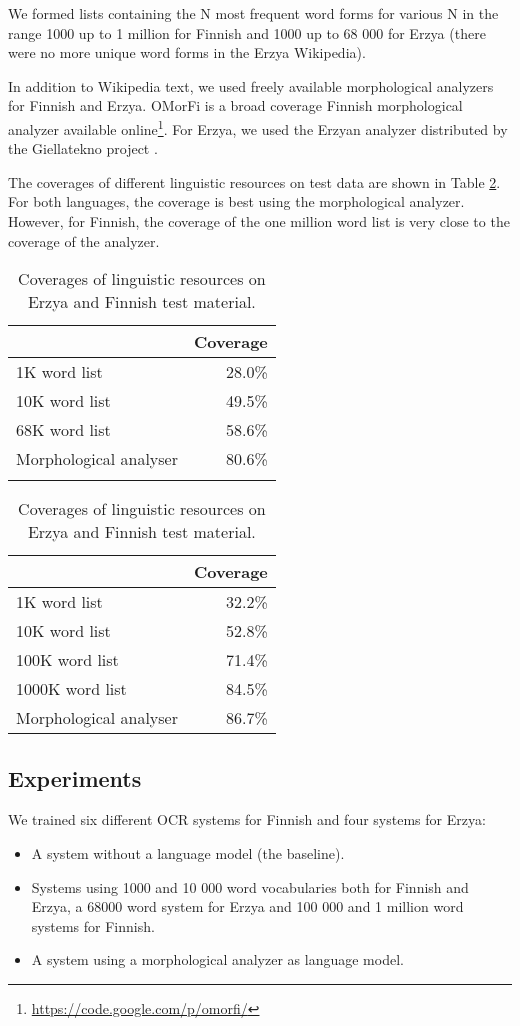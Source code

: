 \documentclass[b5paper]{article}
\begin{document}
We formed lists containing the N most frequent word forms for various
N in the range 1000 up to 1 million for Finnish and 1000 up to 68 000
for Erzya (there were no more unique word forms in the Erzya
Wikipedia).
 
In addition to Wikipedia text, we used freely available morphological
analyzers for Finnish and Erzya. OMorFi \cite{pirinen11} is a broad
coverage Finnish morphological analyzer available
online\footnote{\url{https://code.google.com/p/omorfi/}}. For Erzya,
we used the Erzyan analyzer distributed by the Giellatekno project
\cite{moshagen14}.

The coverages of different linguistic resources on test data are shown
in Table \ref{fin-myv-coverage}. For both languages, the coverage is
best using the morphological analyzer. However, for Finnish, the
coverage of the one million word list is very close to the coverage of
the analyzer.

\begin{table}[!htb]
\begin{center}
\begin{tabular}{lr}
\hline 
                        & Coverage  \\
\hline 
1K word list            &   28.0\%  \\
10K word list           &   49.5\%  \\
68K word list           &   58.6\%  \\
Morphological analyser  &   80.6\%  \\
                        &
\end{tabular}
\quad
\begin{tabular}{lr}
\hline 
                        & Coverage \\
\hline 
1K word list            &  32.2\% \\
10K word list           &  52.8\% \\
100K word list          &  71.4\% \\
1000K word list         &  84.5\% \\
Morphological analyser  &  86.7\% 
\end{tabular}
\caption{Coverages of linguistic resources on Erzya and Finnish test material.}\label{fin-myv-coverage}
\end{center}
\end{table}

\subsection{Experiments}
We trained six different OCR systems for Finnish and four systems for Erzya:
\begin{itemize}
\item A system without a language model (the baseline).
\item Systems using 1000 and 10 000 word vocabularies both for Finnish
  and Erzya, a 68000 word system for Erzya and 100 000 and 1 million
  word systems for Finnish.
\item A system using a morphological analyzer as language model.
\end{itemize}
\end{document}
